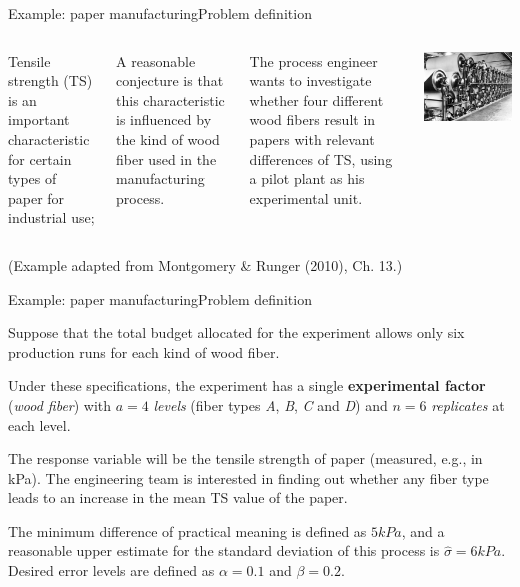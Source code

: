 \begin{frame}{Example: paper manufacturing}{Problem definition}
\begin{columns}
  Tensile strength (TS) is an important characteristic for certain types of paper for industrial use;
  \bigskip

  A reasonable conjecture is that this characteristic is influenced by the kind of wood fiber used in the manufacturing process.
  \bigskip

  The process engineer wants to investigate whether four different wood fibers result in papers with relevant differences of TS, using a pilot plant as his experimental unit.

    \includegraphics[width=\textwidth]{../img/papermill.jpg}
  \end{columns}

  \vfill
{\tiny (Example adapted from Montgomery \& Runger (2010), Ch. 13.)}
\end{frame}

\begin{frame}{Example: paper manufacturing}{Problem definition}

Suppose that the total budget allocated for the experiment allows only six production runs for each kind of wood fiber.
\bigskip

Under these specifications, the experiment has a single {\bf experimental factor} (\textit{wood fiber}) with $a = 4$ \textit{levels} (fiber types \textit{A}, \textit{B}, \textit{C} and \textit{D}) and $n = 6$ \textit{replicates} at each level.
\bigskip

The response variable will be the tensile strength of paper (measured, e.g., in kPa). The engineering team is interested in finding out whether any fiber type leads to an increase in the mean TS value of the paper.
\bigskip

The minimum difference of practical meaning is defined as $5 kPa$, and a reasonable upper estimate for the standard deviation of this process is $\hat{\sigma} = 6 kPa$. Desired error levels are defined as $\alpha = 0.1$ and $\beta = 0.2$.
\end{frame}


